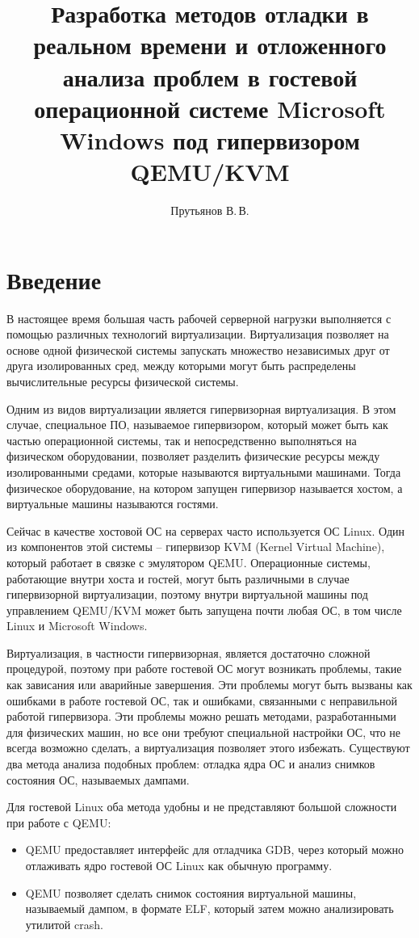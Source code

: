 \documentclass{mipt-thesis-bs}
\title{Разработка методов отладки в реальном времени и отложенного анализа проблем в гостевой операционной системе Microsoft Windows под гипервизором QEMU/KVM}
\author{Прутьянов В.\,В.}
\begin{document}
\titlecontents

\chapter{Введение}

В настоящее время большая часть рабочей серверной нагрузки выполняется с помощью различных технологий виртуализации\cite{server-trends}. Виртуализация позволяет на основе одной физической системы запускать множество независимых друг от друга изолированных сред, между которыми могут быть распределены вычислительные ресурсы физической системы.

Одним из видов виртуализации является гипервизорная виртуализация. В этом случае, специальное ПО, называемое гипервизором, который может быть как частью операционной системы, так и непосредственно выполняться на физическом оборудовании, позволяет разделить физические ресурсы между изолированными средами, которые называются виртуальными машинами\cite{t1}. Тогда физическое оборудование, на котором запущен гипервизор называется хостом, а виртуальные машины называются гостями.

Сейчас в качестве хостовой ОС на серверах часто используется ОС Linux. Один из компонентов этой системы -- гипервизор KVM (Kernel Virtual Machine), который работает в связке с эмулятором QEMU. Операционные системы, работающие внутри хоста и гостей, могут быть различными в случае гипервизорной виртуализации, поэтому внутри виртуальной машины под управлением QEMU/KVM может быть запущена почти любая ОС, в том числе Linux и Microsoft Windows.

Виртуализация, в частности гипервизорная, является достаточно сложной процедурой, поэтому при работе гостевой ОС могут возникать проблемы, такие как зависания или аварийные завершения. Эти проблемы могут быть вызваны как ошибками в работе гостевой ОС, так и ошибками, связанными с неправильной работой гипервизора. Эти проблемы можно решать методами, разработанными для физических машин, но все они требуют специальной настройки ОС, что не всегда возможно сделать, а виртуализация позволяет этого избежать. Существуют два метода анализа подобных проблем: отладка ядра ОС и анализ снимков состояния ОС, называемых дампами.

Для гостевой Linux оба метода удобны и не представляют большой сложности при работе с QEMU:

\begin{itemize}
\item QEMU предоставляет интерфейс для отладчика GDB, через который можно отлаживать ядро гостевой ОС Linux как обычную программу\cite{qemu-gdb}.
\item QEMU позволяет сделать снимок состояния виртуальной машины, называемый дампом, в формате ELF, который затем можно анализировать утилитой crash.
\end{itemize}
\end{document}
